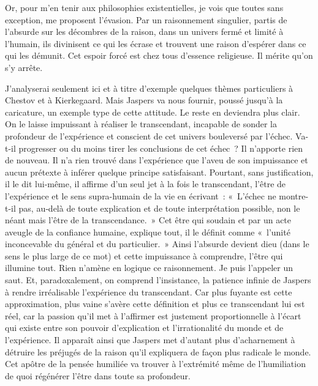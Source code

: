 \documentclass{book}
\begin{document}
Or, pour m'en tenir aux philosophies existentielles, je vois que toutes sans exception, me proposent l'évasion. Par un raisonnement singulier, partis de l'absurde sur les décombres de la raison, dans un univers fermé et limité à l'humain, ils divinisent ce qui les écrase et trouvent une raison d'espérer dans ce qui les démunit. Cet espoir forcé est chez tous d'essence religieuse. Il mérite qu'on s'y arrête.

J'analyserai seulement ici et à titre d'exemple quelques thèmes particuliers à Chestov et à Kierkegaard. Mais Jaspers va nous fournir, poussé jusqu'à la caricature, un exemple type de cette attitude. Le reste en deviendra plus clair. On le laisse impuissant à réaliser le transcendant, incapable de sonder la profondeur de l'expérience et conscient de cet univers bouleversé par l'échec. Va-t-il progresser ou du moins tirer les conclusions de cet échec ? Il n'apporte rien de nouveau. Il n'a rien trouvé dans l'expérience que l'aveu de son impuissance et aucun prétexte à inférer quelque principe satisfaisant. Pourtant, sans justification, il le dit lui‑même, il affirme d'un seul jet à la fois le transcendant, l'être de l'expérience et le sens supra-humain de la vie en écrivant : « L'échec ne montre-t-il pas, au‑delà de toute explication et de toute interprétation possible, non le néant mais l'être de la transcendance. » Cet être qui soudain et par un acte aveugle de la confiance humaine, explique tout, il le définit comme « l'unité inconcevable du général et du particulier. » Ainsi l'absurde devient dieu (dans le sens le plus large de ce mot) et cette impuissance à comprendre, l'être qui illumine tout. Rien n'amène en logique ce raisonnement. Je puis l'appeler un saut. Et, paradoxalement, on comprend l'insistance, la patience infinie de Jaspers à rendre irréalisable l'expérience du transcendant. Car plus fuyante est cette approximation, plus vaine s'avère cette définition et plus ce transcendant lui est réel, car la passion qu'il met à l'affirmer est justement proportionnelle à l'écart qui existe entre son pouvoir d'explication et l'irrationalité du monde et de l'expérience. Il apparaît ainsi que Jaspers met d'autant plus d'acharnement à détruire les préjugés de la raison qu'il expliquera de façon plus radicale le monde. Cet apôtre de la pensée humiliée va trouver à l'extrémité même de l'humiliation de quoi régénérer l'être dans toute sa profondeur.
\end{document}
